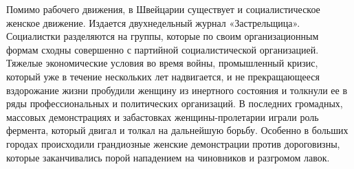 Помимо рабочего движения, в Швейцарии существует и
социалистическое женское движение. Издается двухнедельный
журнал «Застрельщица». Социалистки разделяются на группы,
которые по своим организационным формам сходны совершенно с
партийной социалистической организацией. Тяжелые
экономические условия во время войны, промышленный кризис,
который уже в течение нескольких лет надвигается, и не
прекращающееся вздорожание жизни пробудили женщину из
инертного состояния и толкнули ее в ряды профессиональных и
политических организаций. В последних громадных, массовых
демонстрациях и забастовках женщины-пролетарии играли роль
фермента, который двигал и толкал на дальнейшую борьбу.
Особенно в больших городах происходили грандиозные женские
демонстрации против дороговизны, которые заканчивались
порой нападением на чиновников и разгромом лавок.